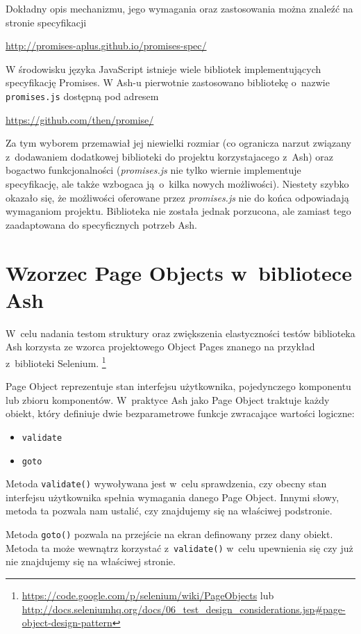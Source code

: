 \documentclass[brudnopis]{xmgr}
\begin{document}
Dokładny opis mechanizmu, jego wymagania oraz zastosowania można znaleźć na  stronie specyfikacji

\url{http://promises-aplus.github.io/promises-spec/}

W środowisku języka JavaScript istnieje wiele bibliotek implementujących specyfikację Promises. W Ash-u pierwotnie zastosowano bibliotekę o~nazwie \texttt{promises.js} dostępną pod adresem

\url{https://github.com/then/promise/}

Za tym wyborem przemawiał jej niewielki rozmiar (co ogranicza narzut związany z~dodawaniem dodatkowej biblioteki do projektu korzystajacego z~Ash) oraz bogactwo funkcjonalności (\textit{promises.js} nie tylko wiernie implementuje specyfikację, ale także wzbogaca ją~o~kilka nowych możliwości). Niestety szybko okazało się, że możliwości oferowane przez \textit{promises.js} nie do końca odpowiadają wymaganiom projektu. Biblioteka nie została jednak porzucona, ale zamiast tego zaadaptowana do specyficznych potrzeb Ash.  

\section{Wzorzec Page Objects w~bibliotece Ash}

W~celu nadania testom struktury oraz zwiększenia elastyczności testów biblioteka Ash korzysta ze wzorca projektowego Object Pages znanego na przykład z~biblioteki Selenium. 
\footnote{ \url{https://code.google.com/p/selenium/wiki/PageObjects}
lub
\url{http://docs.seleniumhq.org/docs/06\_test\_design\_considerations.jsp\#page-object-design-pattern} }

Page Object reprezentuje stan interfejsu użytkownika, pojedynczego komponentu lub zbioru komponentów. W~praktyce Ash jako Page Object traktuje każdy obiekt, który definiuje dwie bezparametrowe funkcje zwracające wartości logiczne:

\begin{itemize}
  \item \texttt{validate}
  \item \texttt{goto}
\end{itemize}

Metoda \texttt{validate()} wywoływana jest w~celu sprawdzenia, czy obecny stan interfejsu użytkownika spełnia wymagania danego Page Object. Innymi słowy, metoda ta pozwala nam ustalić, czy znajdujemy się na właściwej podstronie. 

Metoda \texttt{goto()} pozwala na przejście na ekran definowany przez dany obiekt. Metoda ta może wewnątrz korzystać z~\texttt{validate()} w~celu upewnienia się czy już nie znajdujemy się na właściwej stronie. 
\end{document}
